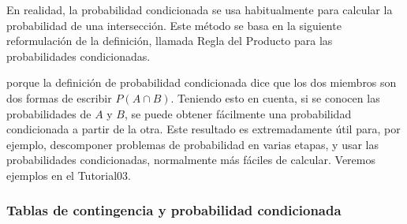 En realidad, la probabilidad condicionada se usa habitualmente para calcular
la probabilidad de una intersección. Este método se basa en la siguiente
reformulación de la definición, llamada {\sf Regla del Producto} para las
probabilidades condicionadas.
        \begin{center}
        \end{center}
porque la definición de probabilidad condicionada dice que los dos miembros son dos formas de escribir $P(A\cap B)$. Teniendo esto en cuenta, si se conocen las probabilidades de $A$ y $B$, se puede obtener fácilmente una probabilidad condicionada a partir de la otra. Este resultado es extremadamente útil para, por ejemplo, descomponer problemas de probabilidad en varias etapas, y usar las probabilidades condicionadas, normalmente más fáciles de calcular. Veremos ejemplos en el Tutorial03.

\subsubsection{Tablas de contingencia y probabilidad condicionada}
\label{cap03:subsubsec:TablasContingenciaProbabilidadCondicionada}

